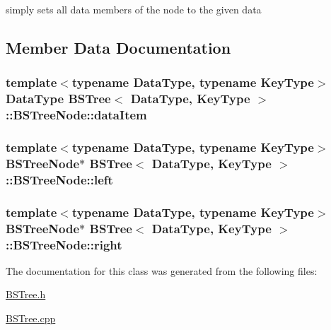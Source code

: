 \begin{DoxyEnumerate}
\item simply sets all data members of the node to the given data
\end{DoxyEnumerate}


\begin{DoxyCode}
\end{DoxyCode}
 

\subsection{\-Member \-Data \-Documentation}
\hypertarget{class_b_s_tree_1_1_b_s_tree_node_a507c8d6dde1b8d35d9af6b4e78f38962}{
\subsubsection[{data\-Item}]{\setlength{\rightskip}{0pt plus 5cm}template$<$typename \-Data\-Type, typename \-Key\-Type$>$ \-Data\-Type {\bf \-B\-S\-Tree}$<$ \-Data\-Type, \-Key\-Type $>$\-::{\bf \-B\-S\-Tree\-Node\-::data\-Item}}}\label{class_b_s_tree_1_1_b_s_tree_node_a507c8d6dde1b8d35d9af6b4e78f38962}
\hypertarget{class_b_s_tree_1_1_b_s_tree_node_a7a90150dd249432e240dc363955c5ca1}{
\subsubsection[{left}]{\setlength{\rightskip}{0pt plus 5cm}template$<$typename \-Data\-Type, typename \-Key\-Type$>$ {\bf \-B\-S\-Tree\-Node}$\ast$ {\bf \-B\-S\-Tree}$<$ \-Data\-Type, \-Key\-Type $>$\-::{\bf \-B\-S\-Tree\-Node\-::left}}}\label{class_b_s_tree_1_1_b_s_tree_node_a7a90150dd249432e240dc363955c5ca1}
\hypertarget{class_b_s_tree_1_1_b_s_tree_node_abcc00fc20d8591933c476b6bcdfdab17}{
\subsubsection[{right}]{\setlength{\rightskip}{0pt plus 5cm}template$<$typename \-Data\-Type, typename \-Key\-Type$>$ {\bf \-B\-S\-Tree\-Node}$\ast$ {\bf \-B\-S\-Tree}$<$ \-Data\-Type, \-Key\-Type $>$\-::{\bf \-B\-S\-Tree\-Node\-::right}}}\label{class_b_s_tree_1_1_b_s_tree_node_abcc00fc20d8591933c476b6bcdfdab17}


\-The documentation for this class was generated from the following files\-:\begin{DoxyCompactItemize}
\item 
\hyperlink{_b_s_tree_8h}{\-B\-S\-Tree.\-h}\item 
\hyperlink{_b_s_tree_8cpp}{\-B\-S\-Tree.\-cpp}\end{DoxyCompactItemize}
